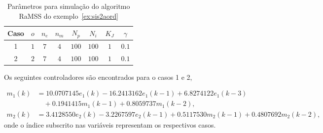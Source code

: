 \begin{exmp}
\begin{table}[htpb]
    \centering
    \caption{Parâmetros para simulação do algoritmo RaMSS do exemplo~\ref{ex:sis2aord} }\label{tab:sis2aord}
    \begin{tabular}{c|c|c|c|c|c|c|c}
        Caso & $o$ & $n_e$ & $n_m$ & $N_p$ & $N_i$ & $K_J$ & $\gamma$ \\
        \hline
        1 & $ 1 $ & $7$ & $4$ & $100$ & $100$ & $1$ & $0.1$ \\
        2 & $ 2 $ & $7$ & $4$ & $100$ & $100$ & $1$ & $0.1$
    \end{tabular}
\end{table}

Os seguintes  controladores são encontrados para o casos 1 e 2,

\begin{align*}
   \label{eq:contEst_sis2aord}
   m_1(k) &= 10.0707145 e_1(k) - 16.2413162 e_1(k-1) + 6.8274122 e_1(k-3) \\ &\quad + 0.1941415 m_1(k-1) +  0.8059737 m_1(k-2), \\
   m_2(k) &= 3.4128550 e_2(k) - 3.2267597e_2(k-1) + 0.5117530 m_2(k-1) +  0.4807692m_2(k-2),
\end{align*}
onde o índice subscrito nas variáveis representam os respectivos casos.



\end{exmp}
